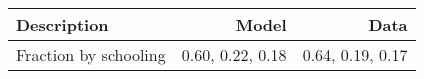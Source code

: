 \begin{tabular}{lrr}
\hline
Description & Model  & Data  \\
\hline
Fraction by schooling & 0.60, 0.22, 0.18  & 0.64, 0.19, 0.17  \\
\hline
\end{tabular}%
